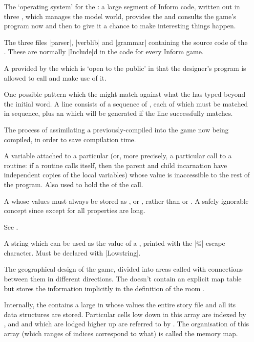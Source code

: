 %
The `operating system' for the : a large segment of Inform
code, written out in three , which manages the model world,
provides the  and consults the game's program now and then to
give it a chance to make interesting things happen.

%
The three files |parser|, |verblib| and |grammar| containing the source
code of the .  These are normally |Include|d in the code for
every Inform game.

%
A  provided by the  which is `open to the public'
in that the designer's program is allowed to call and make use of it.

%
One possible pattern which the  might match against what the
 has typed beyond the initial  word.  A  line
consists of a sequence of , each of which must be matched
in sequence, plus an  which will be generated if the line
successfully matches.

%
The process of assimilating a previously-compiled  into the
game now being compiled, in order to save compilation time.

%
A variable attached to a particular  (or, more precisely,
a particular call to a routine: if a routine calls itself, then the parent
and child incarnation have independent copies of the local variables) whose
value is inaccessible to the rest of the program.  Also used to hold the
 of the call.

%
A  whose values must always be stored as , or
, rather than  or .  A safely
ignorable concept since except for  all properties are
long.

%
See .

%
A string which can be used as the value of a , printed
with the |@| escape character.  Must be declared with |Lowstring|.

%
The geographical design of the game, divided into areas called 
with connections between them in different directions.  The 
doesn't contain an explicit map table but stores the information implicitly
in the definition of the room .

%
Internally, the  contains a large  in whose values
the entire story file and all its data structures are stored.  Particular
cells low down in this array are indexed by , and
 and  which are lodged higher up are referred to by
.  The organisation of this array (which ranges of
indices correspond to what) is called the memory map.

